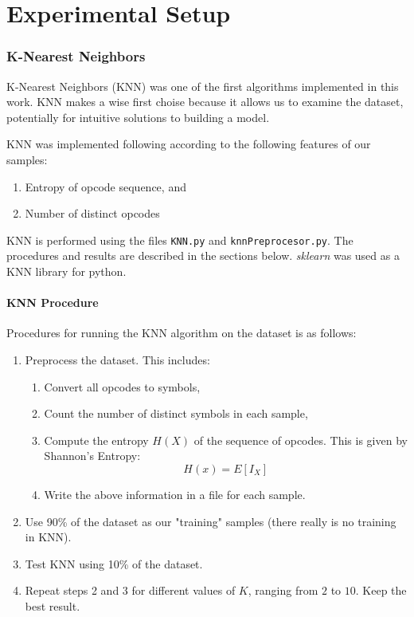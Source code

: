 \documentclass[12pt]{article}
\begin{document}
\part{Experimental Setup}
\section{K-Nearest Neighbors}
K-Nearest Neighbors (KNN) was one of the first algorithms implemented in this work. KNN makes a wise first choise because it allows us to examine the dataset, potentially for intuitive solutions to building a model.

KNN was implemented following according to the following features of our samples:
  \begin{enumerate}
    \item Entropy of opcode sequence, and
    \item Number of distinct opcodes
  \end{enumerate}
  KNN is performed using the files \texttt{KNN.py} and \texttt{knnPreprocesor.py}. The procedures and results are described in the sections below. \textit{sklearn} was used as a KNN library for python.

\subsection{KNN Procedure}
  Procedures for running the KNN algorithm on the dataset is as follows:
  \begin{enumerate}
    \item Preprocess the dataset. This includes:
        \begin{enumerate}
          \item Convert all opcodes to symbols,
          \item Count the number of distinct symbols in each sample,
          \item Compute the entropy $H(X)$ of the sequence of opcodes. This is given by Shannon's Entropy:
          \begin{equation}
            H(x) = E[I_X] 
          \end{equation}
        \item Write the above information in a file for each sample.
        \end{enumerate}
      \item Use 90\% of the dataset as our "training" samples (there really is no training in KNN).
      \item Test KNN using 10\% of the dataset.
      \item Repeat steps 2 and 3 for different values of $K$, ranging from $2$ to $10$. Keep the best result.
  \end{enumerate}
\end{document}
